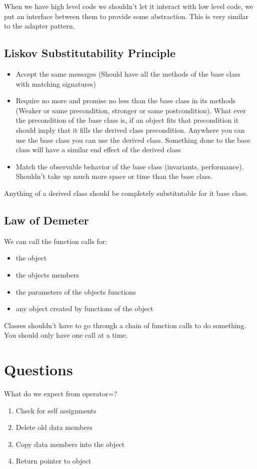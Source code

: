 \documentclass[12pt]{article}
\begin{document}
When we have high level code we shouldn't let it interact with low level code, we put an interface between them to provide some abstraction. This is very similar to the adapter pattern.

\subsection*{Liskov Substitutability Principle}
\begin{itemize}
  \item Accept the same messages (Should have all the methods of the base class with matching signatures)
  \item Require no more and promise no less than the base class in its methods (Weaker or same precondition, stronger or same postcondition). What ever the precondition of the base class is, if an object fits that precondition it should imply that it fills the derived class precondition. Anywhere you can use the base class you can use the derived class.  Something done to the base class will have a similar end effect of the derived class
  \item Match the observable behavior of the base class (invariants, performance). Shouldn't take up much more space or time than the base class.
\end{itemize}

Anything of a derived class should be completely substitutable for it base class.


\subsection*{Law of Demeter}
We can call the function calls for:
\begin{itemize}
  \item the object
  \item the objects members
  \item the parameters of the objects functions
  \item any object created by functions of the object
\end{itemize}

Classes shouldn't have to go through a chain of function calls to do something. You should only have  one call at a time.


\section{Questions}
What do we expect from operator=?
\begin{enumerate}
  \item Check for self assignments
  \item Delete old data members
  \item Copy data members into the object
  \item Return pointer to object
\end{enumerate}
\end{document}
